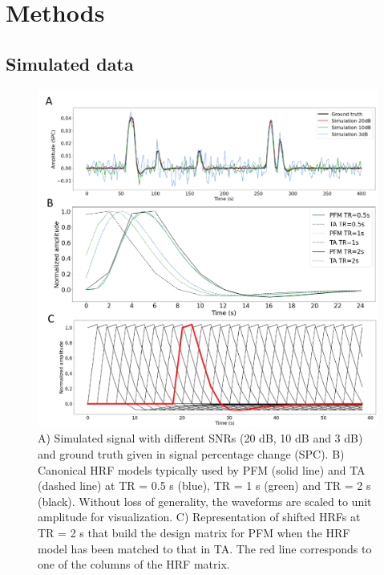 
\section{Methods}
\label{sec:data}

\subsection{Simulated data}

\begin{figure}[t!]
    \begin{center}
        \includegraphics[width=0.75\columnwidth]{figures/sim_and_hrf.pdf}
    \end{center}
    \caption{A) Simulated signal with different SNRs (20 dB, 10 dB and 3 dB) and ground truth given in signal percentage change (SPC). B) Canonical HRF models typically used by PFM (solid line) and TA (dashed line) at TR = 0.5 s (blue), TR = 1 s (green) and TR = 2 s (black). Without loss of generality, the waveforms are scaled to unit amplitude for visualization. C) Representation of shifted HRFs at TR = 2 s that build the design matrix for PFM when the HRF model has been matched to that in TA. The red line corresponds to one of the columns of the HRF matrix. }
\label{fig:sim_and_hrf}
\end{figure}

